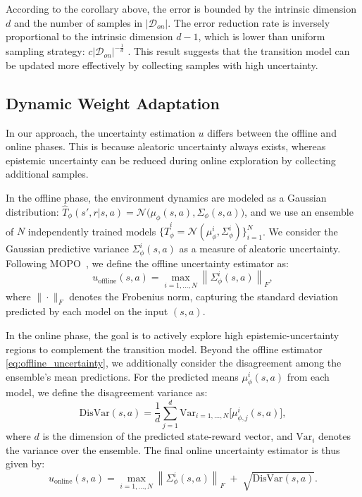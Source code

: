 \documentclass[letterpaper]{article} %
\begin{document}
According to the corollary above, the error is bounded by the intrinsic dimension $d$ and the number of samples in $|\mathcal{D}_{on}|$. The error reduction rate is inversely proportional to the intrinsic dimension $d-1$, which is lower than uniform sampling strategy: $c|\mathcal{D}_{on}|^{-\frac{1}{d}}$ \cite{korostelev1999minimax}. This result suggests that the transition model can be updated more effectively by collecting samples with high uncertainty.

\subsection{Dynamic Weight Adaptation}

In our approach, the uncertainty estimation \(u\) differs between the offline and online phases. This is because aleatoric uncertainty always exists, whereas epistemic uncertainty can be reduced during online exploration by collecting additional samples.

In the offline phase, the environment dynamics are modeled as a Gaussian distribution:
\(
\hat{T}_\phi(s', r|s,a) = \mathcal{N}\!\big(\mu_\phi(s,a), \Sigma_\phi(s,a)\big)
\),
and we use an ensemble of \(N\) independently trained models
\(
\{\hat{T}^i_\phi = \mathcal{N}(\mu^i_\phi, \Sigma^i_\phi)\}_{i=1}^N
\).
We consider the Gaussian predictive variance \(\Sigma^i_\phi(s,a)\) as a measure of aleatoric uncertainty.
Following MOPO~\cite{mopo}, we define the offline uncertainty estimator as:
%
\begin{equation}
u_{\text{offline}}(s,a) = \max_{i=1,\dots,N} \left\| \Sigma^i_\phi(s, a) \right\|_F,
\label{eq:offline_uncertainty}
\end{equation}
%
where \(\|\cdot\|_F\) denotes the Frobenius norm, capturing the standard deviation predicted by each model on the input \((s,a)\).

In the online phase, the goal is to actively explore high epistemic-uncertainty regions to complement the transition model.
Beyond the offline estimator \eqref{eq:offline_uncertainty}, we additionally consider the disagreement among the ensemble’s mean predictions.
For the predicted means \(\mu^i_\phi(s,a)\) from each model, we define the disagreement variance as:
%
\begin{equation}
\mathrm{DisVar}(s,a) =
\frac{1}{d}\sum_{j=1}^d \mathrm{Var}_{i=1,\dots,N}\!\big[\mu^i_{\phi,j}(s,a)\big],
\end{equation}
%
where \(d\) is the dimension of the predicted state-reward vector, and \(\mathrm{Var}_i\) denotes the variance over the ensemble.
The final online uncertainty estimator is thus given by:
%
\begin{equation}
u_{\text{online}}(s,a) =
\max_{i=1,\dots,N} \left\| \Sigma^i_\phi(s, a) \right\|_F
\;+\;
\sqrt{\mathrm{DisVar}(s,a)}.
\label{eq:online_uncertainty}
\end{equation}
\end{document}
